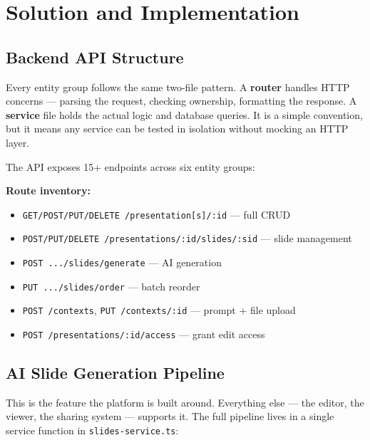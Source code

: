 \documentclass[10pt,a4paper]{article}
\begin{document}
\section{Solution and Implementation}

\subsection{Backend API Structure}

Every entity group follows the same two-file pattern. A \textbf{router} handles HTTP concerns --- parsing the request, checking ownership, formatting the response. A \textbf{service} file holds the actual logic and database queries. It is a simple convention, but it means any service can be tested in isolation without mocking an HTTP layer.

The API exposes 15+ endpoints across six entity groups:

\begin{keybox}
\small\textbf{Route inventory:}
\begin{itemize}[leftmargin=*, noitemsep, topsep=3pt]
  \item \texttt{GET/POST/PUT/DELETE /presentation[s]/:id} --- full CRUD
  \item \texttt{POST/PUT/DELETE /presentations/:id/slides/:sid} --- slide management
  \item \texttt{POST .../slides/generate} --- AI generation
  \item \texttt{PUT .../slides/order} --- batch reorder
  \item \texttt{POST /contexts}, \texttt{PUT /contexts/:id} --- prompt + file upload
  \item \texttt{POST /presentations/:id/access} --- grant edit access
\end{itemize}
\end{keybox}

\subsection{AI Slide Generation Pipeline}

This is the feature the platform is built around. Everything else --- the editor, the viewer, the sharing system --- supports it. The full pipeline lives in a single service function in \texttt{slides-service.ts}:
\end{document}
